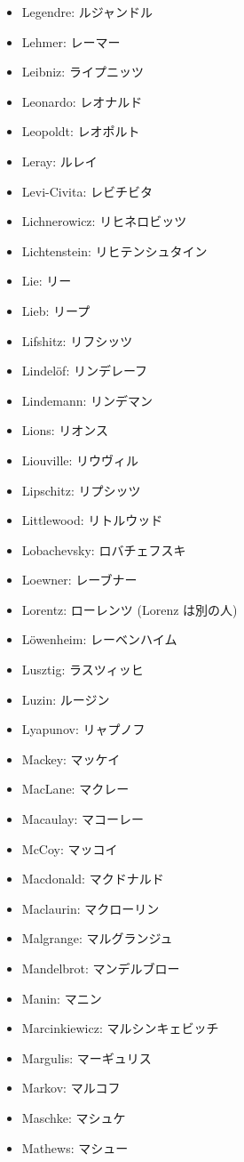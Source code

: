\documentclass[openany, a4paper, oneside]{jsbook}
\begin{document}
\begin{itemize}
\item Legendre: ルジャンドル
\item Lehmer: レーマー
\item Leibniz: ライプニッツ
\item Leonardo: レオナルド
\item Leopoldt: レオポルト
\item Leray: ルレイ
\item Levi-Civita: レビチビタ
\item Lichnerowicz: リヒネロビッツ
\item Lichtenstein: リヒテンシュタイン
\item Lie: リー
\item Lieb: リープ
\item Lifshitz: リフシッツ
\item Lindel\"of: リンデレーフ
\item Lindemann: リンデマン
\item Lions: リオンス
\item Liouville: リウヴィル
\item Lipschitz: リプシッツ
\item Littlewood: リトルウッド
\item Lobachevsky: ロバチェフスキ
\item Loewner: レーブナー
\item Lorentz: ローレンツ (Lorenz は別の人)
\item L\"owenheim: レーベンハイム
\item Lusztig: ラスツィッヒ
\item Luzin: ルージン
\item Lyapunov: リャプノフ
\item Mackey: マッケイ
\item MacLane: マクレー
\item Macaulay: マコーレー
\item McCoy: マッコイ
\item Macdonald: マクドナルド
\item Maclaurin: マクローリン
\item Malgrange: マルグランジュ
\item Mandelbrot: マンデルブロー
\item Manin: マニン
\item Marcinkiewicz: マルシンキェビッチ
\item Margulis: マーギュリス
\item Markov: マルコフ
\item Maschke: マシュケ
\item Mathews: マシュー

\end{itemize}
\end{document}
